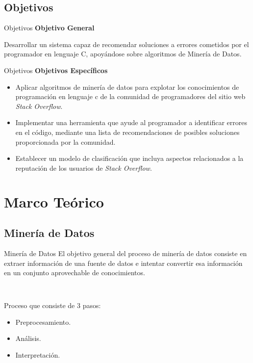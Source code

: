 \documentclass{beamer}
\begin{document}
\subsection{Objetivos}
\begin{frame}{Objetivos}
\textbf{Objetivo General}


\begin{center}
Desarrollar un sistema capaz de recomendar soluciones a errores cometidos por el programador en lenguaje C,
apoyándose sobre algoritmos de Minería de Datos.
\end{center}
\end{frame}

\begin{frame}{Objetivos}
\textbf{Objetivos Específicos}

\begin{itemize}
  \item Aplicar algoritmos de minería de datos para explotar los conocimientos
  de programación en lenguaje c de la comunidad de programadores del sitio web \textit{Stack Overflow}.
  
  \item Implementar una herramienta que ayude al programador a identificar errores en el código,
  mediante una lista de recomendaciones de posibles soluciones proporcionada por la comunidad.

  \item Establecer un modelo de clasificación que incluya aspectos relacionados
  a la reputación de los usuarios de \textit{Stack Overflow}.
\end{itemize}
\end{frame}

\section{Marco Teórico}
\subsection{Minería de Datos}
\begin{frame}{Minería de Datos}
El objetivo general del proceso de minería de datos consiste en extraer
información de una fuente de datos e intentar convertir esa información
en un conjunto aprovechable de conocimientos.

~

Proceso que consiste de 3 pasos:
\begin{itemize}
  \item Preprocesamiento.
  \item Análisis.
  \item Interpretación.
\end{itemize}
\end{frame}
\end{document}

